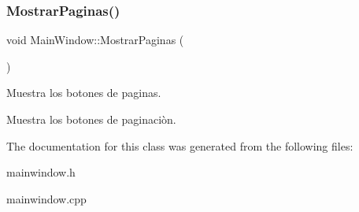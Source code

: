 \subsubsection{\texorpdfstring{Mostrar\+Paginas()}{MostrarPaginas()}}
{\footnotesize\ttfamily void Main\+Window\+::\+Mostrar\+Paginas (\begin{DoxyParamCaption}{ }\end{DoxyParamCaption})}



Muestra los botones de paginas. 

Muestra los botones de paginaciòn. 

The documentation for this class was generated from the following files\+:\begin{DoxyCompactItemize}
\item 
mainwindow.\+h\item 
mainwindow.\+cpp\end{DoxyCompactItemize}
